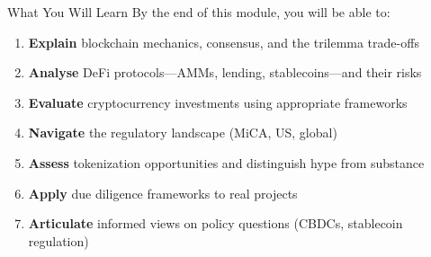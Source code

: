 \documentclass[10pt]{beamer}
\begin{document}
\begin{frame}{What You Will Learn}
  By the end of this module, you will be able to:
  
  \vspace{0.5em}
  \begin{enumerate}
    \item \textbf{Explain} blockchain mechanics, consensus, and the trilemma trade-offs
    
    \vspace{0.3em}
    \item \textbf{Analyse} DeFi protocols---AMMs, lending, stablecoins---and their risks
    
    \vspace{0.3em}
    \item \textbf{Evaluate} cryptocurrency investments using appropriate frameworks
    
    \vspace{0.3em}
    \item \textbf{Navigate} the regulatory landscape (MiCA, US, global)
    
    \vspace{0.3em}
    \item \textbf{Assess} tokenization opportunities and distinguish hype from substance
    
    \vspace{0.3em}
    \item \textbf{Apply} due diligence frameworks to real projects
    
    \vspace{0.3em}
    \item \textbf{Articulate} informed views on policy questions (CBDCs, stablecoin regulation)
  \end{enumerate}
\end{frame}
\end{document}
